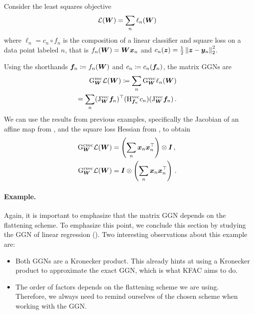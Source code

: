 \switchcolumn[1]
\begin{example}\label{ex:ggn-linear-regression}
  Consider the least squares objective
  \begin{align*}
    {\mathcal{L}}({\bm{W}}) = \sum_n \ell_n({\bm{W}})
  \end{align*}
  where $\ell_n = c_n \circ f_n$ is the composition of a linear classifier and square loss
  on a data point labeled $n$, that is
  $f_n({\bm{W}}) = {\bm{W}} {\bm{x}}_n$ and $c_n({\bm{z}}) = \frac{1}{2}\left\lVert {\bm{z}} - {\bm{y}}_n \right\rVert^2_2$.

  Using the shorthands ${\bm{f}}_n \coloneq f_n({\bm{W}})$ and $c_n \coloneq c_n({\bm{f}}_n)$, the matrix GGNs are
  \begin{align*}
    \mathrm{G}_{{\bm{W}}}^{\operatorname{vec}}{\mathcal{L}}({\bm{W}})
    \coloneq
    \sum_n
    \mathrm{G}_{{\bm{W}}}^{\operatorname{vec}} \ell_n({\bm{W}})
    \\
    =
    \sum_n
    (\mathrm{J}^{\operatorname{vec}}_{{\bm{W}}} {\bm{f}}_n)^{\top}
    (\mathrm{H}^{\operatorname{vec}}_{{\bm{f}}_n} c_n)
    (\mathrm{J}^{\operatorname{vec}}_{{\bm{W}}} {\bm{f}}_n)\,.
  \end{align*}
  We can use the results from previous examples, specifically the Jacobian of an affine map from , and the square loss Hessian from , to obtain
  \begin{align*}
    \mathrm{G}_{{\bm{W}}}^{\operatorname{cvec}}{\mathcal{L}}({\bm{W}})
    & =
      \left(
      \sum_n {\bm{x}}_n {\bm{x}}_n^{\top}
      \right)
      \otimes {\bm{I}}\,,
    \\
    \mathrm{G}_{{\bm{W}}}^{\operatorname{rvec}}{\mathcal{L}}({\bm{W}})
    & =
      {\bm{I}}
      \otimes
      \left(
      \sum_n {\bm{x}}_n {\bm{x}}_n^{\top}
      \right)\,.
  \end{align*}
\end{example}
\switchcolumn[0]

\switchcolumn[1]
\switchcolumn[0]

\paragraph{Example.} Again, it is important to emphasize that the matrix GGN depends on the flattening scheme.
To emphasize this point, we conclude this section by studying the GGN of linear regression ().
Two interesting observations about this example are:
\begin{itemize}
\item Both GGNs are a Kronecker product.
  This already hints at using a Kronecker product to approximate the exact GGN, which is what KFAC aims to do.

\item The order of factors depends on the flattening scheme we are using.
  Therefore, we always need to remind ourselves of the chosen scheme when working with the GGN.
\end{itemize}

